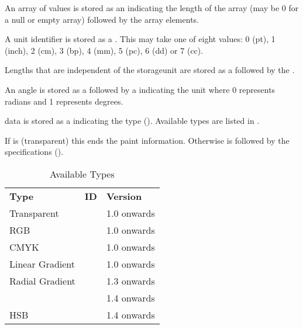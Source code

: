 \begin{deflist}
\begin{itemdesc}
An array of  values is stored as an 
 indicating the length of the array (may be 0 for a null or empty
array) followed by the   array elements.
\end{itemdesc}

\begin{itemdesc}
A unit identifier is stored as a . This may take one of eight
values: 0 (\gls{pt}), 1 (inch), 2 (cm), 3 (\gls{bp}), 4 (mm), 5
(pc), 6 (dd) or 7 (cc).
\end{itemdesc}

\begin{itemdesc}
Lengths that are independent of the \gls{storageunit} are stored as a
 followed by the .
\end{itemdesc}

\begin{itemdesc}
An angle is stored as a  followed by a 
indicating the unit where 0 represents radians and 1 represents
degrees.
\end{itemdesc}

\begin{itemdesc}
 data is stored as a  indicating the
 type ().  Available types are listed in
.

If  is  (transparent) this ends the paint
information. Otherwise  is followed by the
 specifications ().

\begin{table}[htbp]
\caption{Available  Types}
\label{tab:jdrcolourtypes}
\centering
\begin{tabular}{lll}
\bfseries Type & \bfseries ID & \bfseries Version\\
Transparent & \code{T} & 1.0 onwards\\
RGB & \code{R} & 1.0 onwards\\
CMYK & \code{C} & 1.0 onwards\\
Linear Gradient & \code{G} & 1.0 onwards\\
Radial Gradient & \code{D} & 1.3 onwards\\
\Manmsg{grey} & \code{Y} & 1.4 onwards\\
HSB & \code{S} & 1.4 onwards
\end{tabular}
\end{table}
\end{itemdesc}



\end{deflist}
